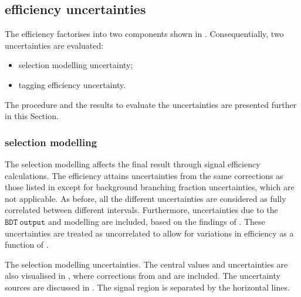 \subsection{\texorpdfstring{\BtoXsgamma}{B->Xs gamma} efficiency uncertainties}\label{sec:signal_selection_uncertainties}

The \BtoXsgamma efficiency factorises into two components shown in .
Consequentially, two uncertainties are evaluated:
\begin{itemize}
    \item \BtoXsgamma selection modelling uncertainty;
    \item \BtoXsgamma tagging efficiency uncertainty.
\end{itemize}
The procedure and the results to evaluate the uncertainties are presented further in this Section.

\subsubsection{\texorpdfstring{\BtoXsgamma}{B->Xs gamma} selection modelling}

The \BtoXsgamma selection modelling affects the final result through signal efficiency calculations.
The efficiency attains uncertainties from the same corrections as those listed in  
except for background branching fraction uncertainties, which are not applicable.
As before, all the different uncertainties are considered as fully correlated between different \EB intervals.
Furthermore, uncertainties due to the $\mathtt{BDT~output}$ and \ZMVA modelling are included, based on the findings of .
These uncertainties are treated as uncorrelated to allow for variations in efficiency as a function of \EB.

\begin{table}[htbp!]
    \centering
    \caption{\label{tab:signal_selection_uncertainties}
    The \BtoXsgamma selection modelling uncertainties.
    The central values and uncertainties are also visualised in ,
    where corrections from  and  are included.
    The uncertainty sources are discussed in .
    The signal region is separated by the horizontal lines.
    }
    
\end{table}

